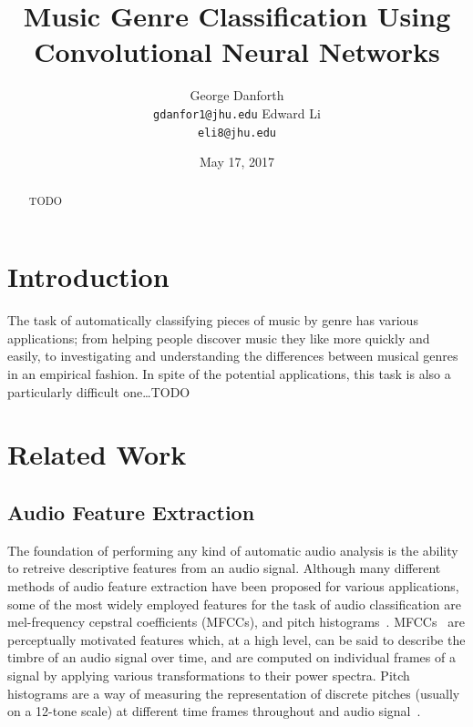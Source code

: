 \documentclass{article} %
\title{Music Genre Classification Using Convolutional Neural Networks}
\author{
George Danforth \\
\texttt{gdanfor1@jhu.edu}
\And\-Edward Li \\
\texttt{eli8@jhu.edu}
}
\date{May 17, 2017}
\begin{document}
\maketitle

\begin{abstract}
TODO
\end{abstract}

\section{Introduction}
The task of automatically classifying pieces of music by genre has various applications; from helping people discover music they like more quickly and easily, to investigating and understanding the differences between musical genres in an empirical fashion. In spite of the potential applications, this task is also a particularly difficult one\ldots TODO


\section{Related Work}
\subsection{Audio Feature Extraction}
The foundation of performing any kind of automatic audio analysis is the ability to retreive descriptive features from an audio signal. Although many different methods of audio feature extraction have been proposed for various applications, some of the most widely employed features for the task of audio classification are mel-frequency cepstral coefficients (MFCCs), and pitch histograms~\cite{survey}. MFCCs~\cite{mfcc} are perceptually motivated features which, at a high level, can be said to describe the timbre of an audio signal over time, and are computed on individual frames of a signal by applying various transformations to their power spectra. Pitch histograms are a way of measuring the representation of discrete pitches (usually on a 12-tone scale) at different time frames throughout and audio signal~\cite{gtzan}.
\end{document}
